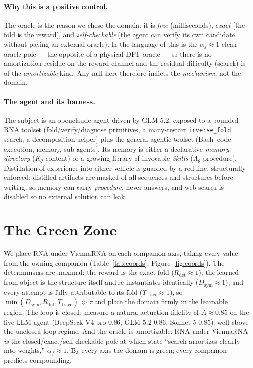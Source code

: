 \documentclass[11pt]{article}
\newcommand{\Dsym}{D_{\mathrm{sym}}}
\newcommand{\Rdet}{R_{\mathrm{det}}}
\newcommand{\Ttrace}{T_{\mathrm{trace}}}
\newcommand{\Ath}{A_{\theta}}
\newcommand{\af}{\alpha_f}
\begin{document}
\paragraph{Why this is a positive control.} The oracle is the reason we chose the domain: it is
\emph{free} (milliseconds), \emph{exact} (the fold is the reward), and \emph{self-checkable} (the agent
can verify its own candidate without paying an external oracle). In the language of
\citet{oracleresidue} this is the $\af\!\approx\!1$ clean-oracle pole --- the opposite of a physical
DFT oracle --- so there is no amortization residue on the reward channel and the residual difficulty
(search) is of the \emph{amortizable} kind. Any null here therefore indicts the \emph{mechanism}, not
the domain.

\paragraph{The agent and its harness.} The subject is an openclaude agent \citep{openclaude} driven by
GLM-5.2, exposed to a bounded RNA toolset (fold/verify/diagnose primitives, a many-restart
\texttt{inverse\_fold} search, a decomposition helper) plus the general agentic toolset (Bash, code
execution, memory, sub-agents). Its memory is either a declarative \emph{memory directory} ($K_\theta$
content) or a growing library of invocable \emph{Skills} ($\Ath$ procedure). Distillation of experience
into either vehicle is guarded by a red line, structurally enforced: distilled artifacts are masked of
all sequences and structures before writing, so memory can carry \emph{procedure}, never answers, and
web search is disabled so no external solution can leak.

\section{The Green Zone}\label{sec:green}
We place RNA-under-ViennaRNA on each companion axis, taking every value from the owning companion
(Table~\ref{tab:coords}, Figure~\ref{fig:coords}). The determinisms are maximal: the reward is the exact
fold ($\Rdet\!\approx\!1$), the learned-from object is the structure itself and re-instantiates
identically ($\Dsym\!\approx\!1$), and every attempt is fully attributable to its fold
($\Ttrace\!\approx\!1$), so $\min(\Dsym,\Rdet,\Ttrace)\gg\tau$ and \citet{determinismmanifold} place the
domain firmly in the learnable region. The loop is closed: \citet{actuation} measure a natural actuation
fidelity of $A\!\approx\!0.85$ on the live LLM agent (DeepSeek-V4-pro $0.86$, GLM-5.2 $0.86$, Sonnet-5
$0.85$), well above the unclosed-loop regime. And the oracle is amortizable: RNA-under-ViennaRNA
\emph{is} the closed/exact/self-checkable pole at which \citet{oracleresidue} state ``search amortizes
cleanly into weights,'' $\af\!\approx\!1$. By every axis the domain is green; every companion predicts
compounding.
\end{document}
